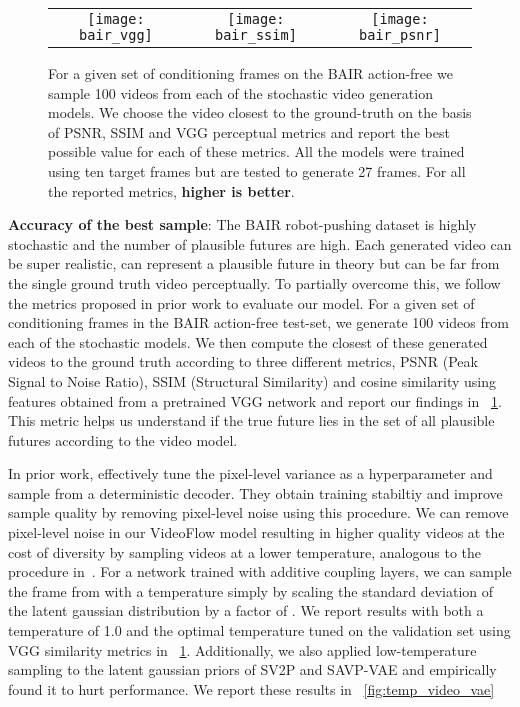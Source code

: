 \documentclass{article} \usepackage{iclr2020_conference,times}
\newcommand{\figref}[1]{\figurename~\ref{#1}}
\begin{document}
\begin{figure}[h]
\begin{tabular}{ccc}
\texttt{[image: bair\_vgg]} & \texttt{[image: bair\_ssim]} & \texttt{[image: bair\_psnr]} \\
\end{tabular}

\caption{For a given set of conditioning frames on the BAIR action-free we sample 100 videos from each of the stochastic video generation models. We choose the video closest to the ground-truth on the basis of PSNR, SSIM and VGG perceptual metrics and report the best possible value for each of these metrics. All the models were trained using ten target frames but are tested to generate 27 frames. For all the reported metrics, \textbf{higher is better}.}
\label{fig:bair_comp}
\end{figure}

\label{subsec:accuracy}
\textbf{Accuracy of the best sample}: The BAIR robot-pushing dataset is highly stochastic and the number of plausible futures are high. Each generated video can be super realistic, can represent a plausible future in theory but can be far from the single ground truth video perceptually. To partially overcome this, we follow the metrics proposed in prior work \citep{babaeizadeh2017stochastic, lee2018stochastic,denton2018stochastic} to evaluate our model. For a given set of conditioning frames in the BAIR action-free test-set, we generate 100 videos from each of the stochastic models. We then compute the 
closest of these generated videos to the ground truth according to three different metrics, PSNR (Peak Signal to Noise Ratio), SSIM (Structural Similarity) \citep{wang2004image} and cosine similarity using features obtained from a pretrained VGG network \citep{dosovitskiy2016generating,johnson2016perceptual} and report our findings in \figref{fig:bair_comp}. This metric helps us understand if the true future lies in the set of all plausible futures according to the video model.

In prior work, \citep{lee2018stochastic,babaeizadeh2017stochastic,denton2018stochastic} effectively tune the pixel-level variance as a hyperparameter and sample from a deterministic decoder. They obtain training stabiltiy and improve sample quality by removing pixel-level noise using this procedure. We can remove pixel-level noise in our VideoFlow model resulting in higher quality videos at the cost of diversity by sampling videos at a lower temperature, analogous to the procedure in~\citep{kingma2018glow}. For a network trained with additive coupling layers, we can sample the  frame  from  with a temperature  simply by scaling the standard deviation of the latent gaussian distribution  by a factor of . We report results with both a temperature of 1.0 and the optimal temperature tuned on the validation set using VGG similarity metrics in \figref{fig:bair_comp}. Additionally, we also applied low-temperature sampling to the latent gaussian priors of SV2P and SAVP-VAE and empirically found it to hurt performance. We report these results in \figref{fig:temp_video_vae}
\end{document}

